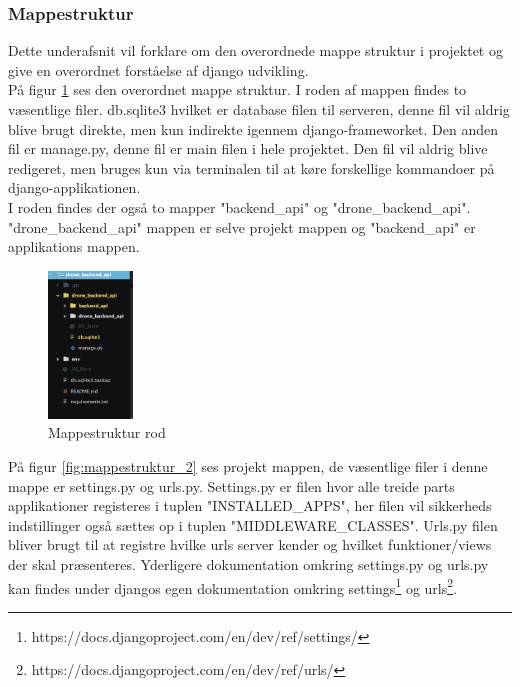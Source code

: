 \subsubsection{Mappestruktur}
Dette underafsnit vil forklare om den overordnede mappe struktur i projektet og give en overordnet forståelse af django udvikling. \\

På figur \ref{fig:mappestruktur_1} ses den overordnet mappe struktur. I roden af mappen findes to væsentlige filer. db.sqlite3 hvilket er database filen til serveren, denne fil vil aldrig blive brugt direkte, men kun indirekte igennem django-frameworket. Den anden fil er manage.py, denne fil er main filen i hele projektet. Den fil vil aldrig blive redigeret, men bruges kun via terminalen til at køre forskellige kommandoer på django-applikationen. \\

I roden findes der også to mapper "backend\_api" og "drone\_backend\_api". \\
"drone\_backend\_api"  mappen er selve projekt mappen og "backend\_api" er applikations mappen.

\begin{figure}[H]
	\centering
	\includegraphics[width=0.2\textwidth]{Billeder/implementation/mappestruktur_1.png}
	\caption{Mappestruktur rod}
	\label{fig:mappestruktur_1}
\end{figure}

På figur \ref{fig:mappestruktur_2} ses projekt mappen, de væsentlige filer i denne mappe er settings.py og urls.py. Settings.py er filen hvor alle treide parts applikationer registeres i tuplen "INSTALLED\_APPS", her filen vil sikkerheds indstillinger også sættes op i tuplen "MIDDLEWARE\_CLASSES". Urls.py filen bliver brugt til at registre hvilke urls server kender og hvilket funktioner/views der skal præsenteres. Yderligere dokumentation omkring settings.py og urls.py kan findes under djangos egen dokumentation omkring settings\footnote{https://docs.djangoproject.com/en/dev/ref/settings/} og urls\footnote{https://docs.djangoproject.com/en/dev/ref/urls/}.

